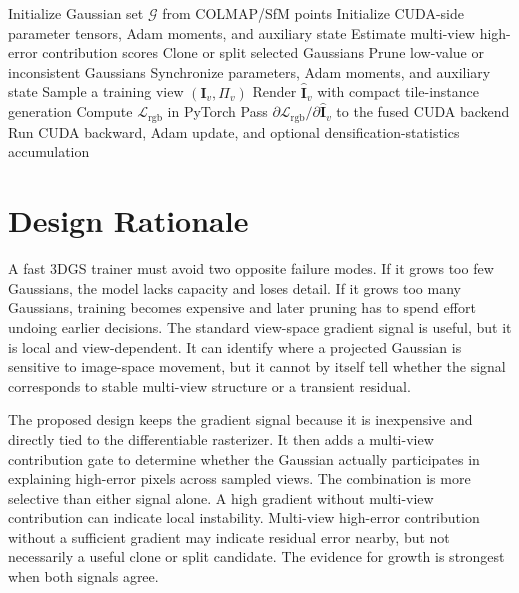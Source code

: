 \begin{algorithm}[H]
\caption{RapidGS training loop}
\label{alg:training-loop}
\begin{algorithmic}[1]
\STATE Initialize Gaussian set $\mathcal{G}$ from COLMAP/SfM points
\STATE Initialize CUDA-side parameter tensors, Adam moments, and auxiliary state
    \STATE Estimate multi-view high-error contribution scores
    \STATE Clone or split selected Gaussians
    \STATE Prune low-value or inconsistent Gaussians
    \STATE Synchronize parameters, Adam moments, and auxiliary state
  \ENDIF
  \STATE Sample a training view $(\mathbf{I}_v,\Pi_v)$
  \STATE Render $\hat{\mathbf{I}}_v$ with compact tile-instance generation
  \STATE Compute $\mathcal{L}_{\mathrm{rgb}}$ in PyTorch
  \STATE Pass $\partial\mathcal{L}_{\mathrm{rgb}}/\partial\hat{\mathbf{I}}_v$ to the fused CUDA backend
  \STATE Run CUDA backward, Adam update, and optional densification-statistics accumulation
\ENDFOR
\end{algorithmic}
\end{algorithm}

\section{Design Rationale}

A fast 3DGS trainer must avoid two opposite failure modes. If it grows too few Gaussians, the model lacks capacity and loses detail. If it grows too many Gaussians, training becomes expensive and later pruning has to spend effort undoing earlier decisions. The standard view-space gradient signal is useful, but it is local and view-dependent. It can identify where a projected Gaussian is sensitive to image-space movement, but it cannot by itself tell whether the signal corresponds to stable multi-view structure or a transient residual.

The proposed design keeps the gradient signal because it is inexpensive and directly tied to the differentiable rasterizer. It then adds a multi-view contribution gate to determine whether the Gaussian actually participates in explaining high-error pixels across sampled views. The combination is more selective than either signal alone. A high gradient without multi-view contribution can indicate local instability. Multi-view high-error contribution without a sufficient gradient may indicate residual error nearby, but not necessarily a useful clone or split candidate. The evidence for growth is strongest when both signals agree.

